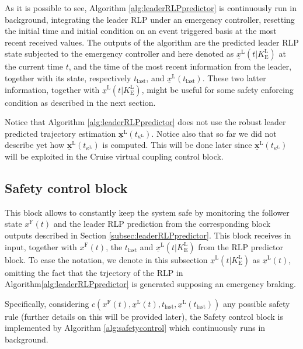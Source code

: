 As it is possible to see, Algorithm \ref{alg:leaderRLPpredictor} is continuously run in background, integrating the leader RLP under an emergency controller, resetting the initial time and initial condition on an event triggered basis at the most recent received values. 
The outputs of the algorithm are the predicted leader RLP state subjected to the emergency controller and here denoted as $\underline{x}^\mathrm{L}(t|K_\mathrm{E}^\mathrm{L})$ at the current time $t$, and the time of the most recent information from the leader, together with its state, respectively $t_{\mathrm{last}}$, and $\underline{x}^\mathrm{L}(t_{\mathrm{last}})$. These two latter information, together with $\underline{x}^\mathrm{L}(t|K_\mathrm{E}^\mathrm{L})$, might be useful for some safety enforcing condition as described in the next section. 


Notice that Algorithm \ref{alg:leaderRLPpredictor} does not use the robust leader predicted trajectory estimation $\underline{\mathbf{x}}^\mathrm{L}(t_{\kappa^\mathrm{L}})$.
Notice also that so far we did not describe yet how $\underline{\mathbf{x}}^\mathrm{L}(t_{\kappa^\mathrm{L}})$ is computed. This will be done later since $\underline{\mathbf{x}}^\mathrm{L}(t_{\kappa^\mathrm{L}})$ will be exploited in the Cruise virtual coupling control block. 


\subsection{Safety control block}
\label{subsec:safetycontrolblock} 

This block allows to constantly keep the system safe by monitoring the follower state $x^\mathrm{F}(t)$ and the leader RLP prediction from the corresponding block outputs described in Section \ref{subsec:leaderRLPpredictor}. This block receives in input, together with $x^\mathrm{F} (t)$, the $t_\mathrm{last}$ and $\underline{x}^\mathrm{L}(t| K_\mathrm{E}^\mathrm{L})$ from the RLP predictor block. To ease the notation, we denote in this subsection $\underline{x}^\mathrm{L}(t| K_\mathrm{E}^\mathrm{L})$ as $ \underline{x}^\mathrm{L}(t)$, omitting the fact that the trjectory of the RLP in Algorithm\tildeAdd\ref{alg:leaderRLPpredictor} is generated supposing an emergency braking.


Specifically, considering $c(x^\mathrm{F}(t),\underline{x}^\mathrm{L}(t),t_{\mathrm{last}},\underline{x}^\mathrm{L}(t_{\mathrm{last}}))$ any possible safety rule (further details on this will be provided later), the Safety control block is implemented by Algorithm \ref{alg:safetycontrol} which continuously runs in background.

